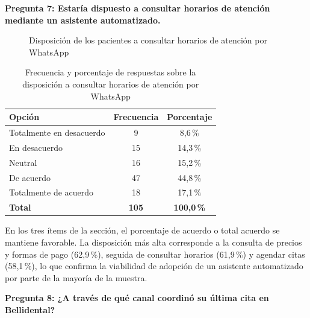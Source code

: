 \medskip
\textbf{Pregunta 7: Estaría dispuesto a consultar horarios de atención mediante un asistente automatizado.}

\begin{figure}[H]
\centering
{}
\caption{Disposición de los pacientes a consultar horarios de atención por WhatsApp}
\label{fig:p7_torta}
\end{figure}

\begin{table}[H]
\centering
\caption{Frecuencia y porcentaje de respuestas sobre la disposición a consultar horarios de atención por WhatsApp}
\label{tab:p7_frecuencia}
\fontsize{10}{12}\selectfont
\renewcommand{\arraystretch}{1.2}
\begin{tabular}{|l|c|c|}
\hline
\textbf{Opción} & \textbf{Frecuencia} & \textbf{Porcentaje} \\ \hline
Totalmente en desacuerdo & 9 & 8{,}6\,\% \\ \hline
En desacuerdo & 15 & 14{,}3\,\% \\ \hline
Neutral & 16 & 15{,}2\,\% \\ \hline
De acuerdo & 47 & 44{,}8\,\% \\ \hline
Totalmente de acuerdo & 18 & 17{,}1\,\% \\ \hline
\textbf{Total} & \textbf{105} & \textbf{100{,}0\,\%} \\ \hline
\end{tabular}
\end{table}

\smallskip
En los tres ítems de la sección, el porcentaje de acuerdo o total acuerdo se mantiene
favorable. La disposición más alta corresponde a la consulta de precios y formas de pago (62{,}9\,\%), seguida
de consultar horarios (61{,}9\,\%) y agendar citas (58{,}1\,\%), lo que confirma la viabilidad
de adopción de un asistente automatizado por parte de la mayoría de la muestra.

\medskip
\textbf{Pregunta 8: ¿A través de qué canal coordinó su última cita en Bellidental?}

